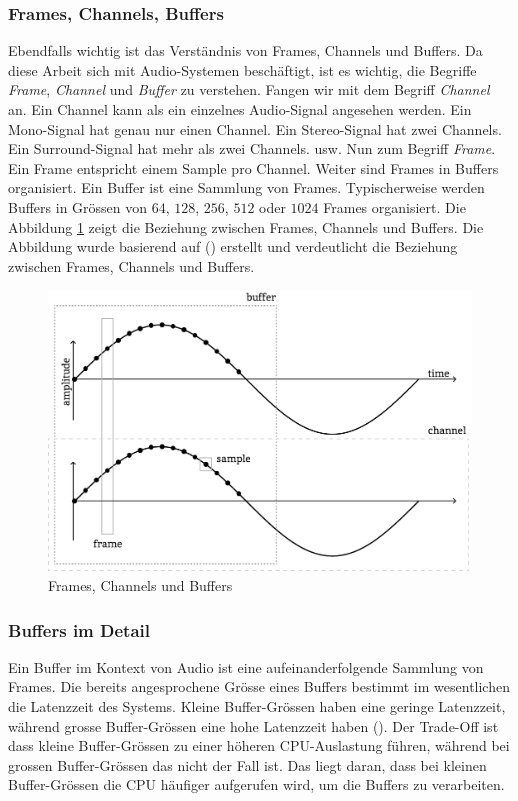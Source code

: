 \documentclass[11pt,a4paper]{article}
\begin{document}
\subsubsection{Frames, Channels, Buffers}
Ebendfalls wichtig ist das Verständnis von Frames, Channels und Buffers. Da diese Arbeit sich mit
Audio-Systemen beschäftigt, ist es wichtig, die Begriffe \textit{Frame}, \textit{Channel} und
\textit{Buffer} zu verstehen. Fangen wir mit dem Begriff \textit{Channel} an. Ein Channel kann als
ein einzelnes Audio-Signal angesehen werden. Ein Mono-Signal hat genau nur einen Channel. Ein
Stereo-Signal hat zwei Channels. Ein Surround-Signal hat mehr als zwei Channels. usw.
Nun zum Begriff \textit{Frame}. Ein Frame entspricht einem Sample pro Channel. Weiter sind Frames
in Buffers organisiert. Ein Buffer ist eine Sammlung von Frames. Typischerweise werden Buffers in
Grössen von \(64\), \(128\), \(256\), \(512\) oder \(1024\) Frames organisiert. Die Abbildung
\ref{fig:frames_channels_buffers} zeigt die Beziehung zwischen Frames, Channels und Buffers.
Die Abbildung wurde basierend auf (\cite[p.10]{somberg2019audioapi}) erstellt und verdeutlicht die
Beziehung zwischen Frames, Channels und Buffers.

\begin{figure}[h]
	\centering
	\includegraphics[width=0.7\linewidth]{img/audio-nutshell.pdf}
	\caption{Frames, Channels und Buffers}
	\label{fig:frames_channels_buffers}
\end{figure}

\subsubsection{Buffers im Detail}
Ein Buffer im Kontext von Audio ist eine aufeinanderfolgende Sammlung von Frames. Die bereits
angesprochene Grösse eines Buffers bestimmt im wesentlichen die Latenzzeit des Systems. Kleine
Buffer-Grössen haben eine geringe Latenzzeit, während grosse Buffer-Grössen eine hohe Latenzzeit
haben (\cite[p.10]{somberg2019audioapi}). Der Trade-Off ist dass kleine Buffer-Grössen
zu einer höheren CPU-Auslastung führen, während bei grossen Buffer-Grössen das nicht der Fall ist.
Das liegt daran, dass bei kleinen Buffer-Grössen die CPU häufiger aufgerufen wird, um die Buffers
zu verarbeiten.
\end{document}
